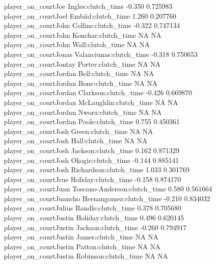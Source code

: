 \documentclass[
  landscape]{article}
\begin{document}
{player\_on\_courtJoe Ingles:clutch\_time -0.350 0.725983\\
player\_on\_courtJoel Embiid:clutch\_time 1.260 0.207760\\
player\_on\_courtJohn Collins:clutch\_time -0.322 0.747134\\
player\_on\_courtJohn Konchar:clutch\_time NA NA\\
player\_on\_courtJohn Wall:clutch\_time NA NA\\
player\_on\_courtJonas Valanciunas:clutch\_time -0.318 0.750653\\
player\_on\_courtJontay Porter:clutch\_time NA NA\\
player\_on\_courtJordan Bell:clutch\_time NA NA\\
player\_on\_courtJordan Bone:clutch\_time NA NA\\
player\_on\_courtJordan Clarkson:clutch\_time -0.426 0.669870\\
player\_on\_courtJordan McLaughlin:clutch\_time NA NA\\
player\_on\_courtJordan Nwora:clutch\_time NA NA\\
player\_on\_courtJordan Poole:clutch\_time 0.755 0.450361\\
player\_on\_courtJosh Green:clutch\_time NA NA\\
player\_on\_courtJosh Hall:clutch\_time NA NA\\
player\_on\_courtJosh Jackson:clutch\_time 0.162 0.871329\\
player\_on\_courtJosh Okogie:clutch\_time -0.144 0.885141\\
player\_on\_courtJosh Richardson:clutch\_time 1.033 0.301769\\
player\_on\_courtJrue Holiday:clutch\_time -0.158 0.874170\\
player\_on\_courtJuan Toscano-Anderson:clutch\_time 0.580 0.561664\\
player\_on\_courtJuancho Hernangomez:clutch\_time -0.210 0.834032\\
player\_on\_courtJulius Randle:clutch\_time 0.378 0.705680\\
player\_on\_courtJustin Holiday:clutch\_time 0.496 0.620145\\
player\_on\_courtJustin Jackson:clutch\_time -0.260 0.794917\\
player\_on\_courtJustin James:clutch\_time NA NA\\
player\_on\_courtJustin Patton:clutch\_time NA NA\\
player\_on\_courtJustin Robinson:clutch\_time NA NA\\
}
\end{document}
